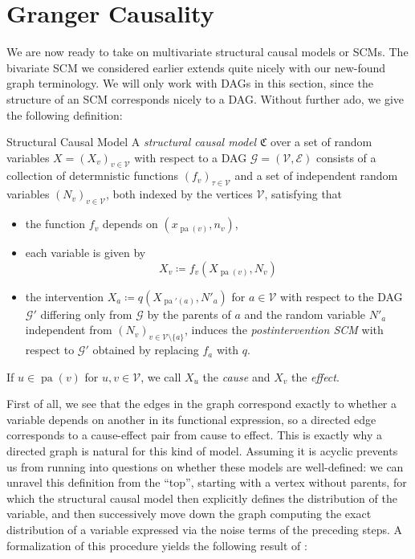 \documentclass[11pt, a4paper]{memoir}
\theoremstyle{break}
\theoremstyle{break}
\theoremstyle{nonumberplain}
\DeclareMathOperator{\pa}{pa}
\begin{document}
\section{Granger Causality}\label{multiSCM}
We are now ready to take on multivariate structural causal models or SCMs. The bivariate SCM we considered earlier extends quite nicely with our new-found graph terminology. We will only work with DAGs in this section, since the structure of an SCM corresponds nicely to a DAG. Without further ado, we give the following definition:
\begin{mydefinition}{Structural Causal Model}
A \emph{structural causal model} $\mathfrak{C}$ over a set of random variables $X=(X_v)_{v\in \mathcal{V}}$ with respect to a DAG $\mathcal{G}=(\mathcal{V},\mathcal{E})$ consists of a collection of determnistic functions $(f_v)_{\tau\in \mathcal{V}}$ and a set of independent random variables $(N_v)_{v\in \mathcal{V}}$, both indexed by the vertices $\mathcal{V}$, satisfying that
\begin{itemize}
	\item the function $f_v$ depends on $\left(x_{\pa(v)}, n_v\right)$,
	\item each variable is given by
	$$X_v\coloneqq f_v\left(X_{\pa(v)}, N_v\right)$$
	\item the intervention $X_a\coloneqq q\left(X_{\pa'(a)}, N'_a\right)$ for $a\in \mathcal{V}$ with respect to the DAG $\mathcal{G}'$ differing only from $\mathcal{G}$ by the parents of $a$ and the random variable $N'_a$ independent from $(N_v)_{v\in \mathcal{V}\setminus \{a\}}$, induces the \emph{postintervention SCM} with respect to $\mathcal{G}'$ obtained by replacing $f_a$ with $q$.
\end{itemize}
If $u\in \pa(v)$ for $u,v\in \mathcal{V}$, we call $X_u$ the \emph{cause} and $X_v$ the \emph{effect}. 
\end{mydefinition}
\noindent First of all, we see that the edges in the graph correspond exactly to whether a variable depends on another in its functional expression, so a directed edge corresponds to a cause-effect pair from cause to effect. This is exactly why a directed graph is natural for this kind of model. Assuming it is acyclic prevents us from running into questions on whether these models are well-defined: we can unravel this definition from the \enquote{top}, starting with a vertex without parents, for which the structural causal model then explicitly defines the distribution of the variable, and then successively move down the graph computing the exact distribution of a variable expressed via the noise terms of the preceding steps. A formalization of this procedure yields the following result of \cite{Pearl}:
\end{document}
